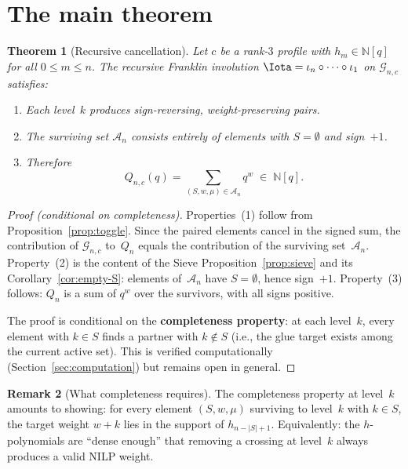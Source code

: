 \documentclass[11pt]{article}
\newcommand{\N}{\mathbb{N}}
\theoremstyle{plain}
\newtheorem{theorem}{Theorem}[section]
\theoremstyle{definition}
\newtheorem{remark}[theorem]{Remark}
\begin{document}
\section{The main theorem}
\label{sec:main}

\begin{theorem}[Recursive cancellation]
\label{thm:main}
Let $c$ be a rank-$3$ profile with
$h_m \in \N[q]$ for all $0 \leq m \leq n$.  The
recursive Franklin involution
$\Iota = \iota_n \circ \cdots \circ \iota_1$
on $\mathcal{G}_{n,c}$ satisfies:
\begin{enumerate}
  \item Each level~$k$ produces sign-reversing,
    weight-preserving pairs.
  \item The surviving set $\mathcal{A}_n$ consists entirely
    of elements with $S = \emptyset$ and sign~$+1$.
  \item Therefore
    \begin{equation}\label{eq:positivity}
      Q_{n,c}(q) = \sum_{(S,w,\mu) \in \mathcal{A}_n}
        q^w \;\in\; \N[q].
    \end{equation}
\end{enumerate}
\end{theorem}

\begin{proof}[Proof \textup{(}conditional on
  completeness\textup{)}]
Properties~(1) follow from Proposition~\ref{prop:toggle}.
Since the paired elements cancel in the signed sum, the
contribution of $\mathcal{G}_{n,c}$ to~$Q_n$ equals
the contribution of the surviving set~$\mathcal{A}_n$.
Property~(2) is the content of the Sieve
Proposition~\ref{prop:sieve} and its
Corollary~\ref{cor:empty-S}: elements of~$\mathcal{A}_n$
have $S = \emptyset$, hence sign~$+1$.  Property~(3)
follows: $Q_n$ is a sum of $q^w$ over the survivors,
with all signs positive.

The proof is conditional on the
\textbf{completeness property}: at each level~$k$, every
element with $k \in S$ finds a partner with $k \notin S$
(i.e., the glue target exists among the current active set).
This is verified computationally
(Section~\ref{sec:computation}) but remains open in general.
\end{proof}

\begin{remark}[What completeness requires]
\label{rem:completeness}
The completeness property at level~$k$ amounts to showing:
for every element $(S, w, \mu)$ surviving to level~$k$
with $k \in S$, the target weight $w + k$ lies in the
support of $h_{n - |S| + 1}$.  Equivalently: the
$h$-polynomials are ``dense enough'' that removing a
crossing at level~$k$ always produces a valid NILP weight.
\end{remark}
\end{document}

